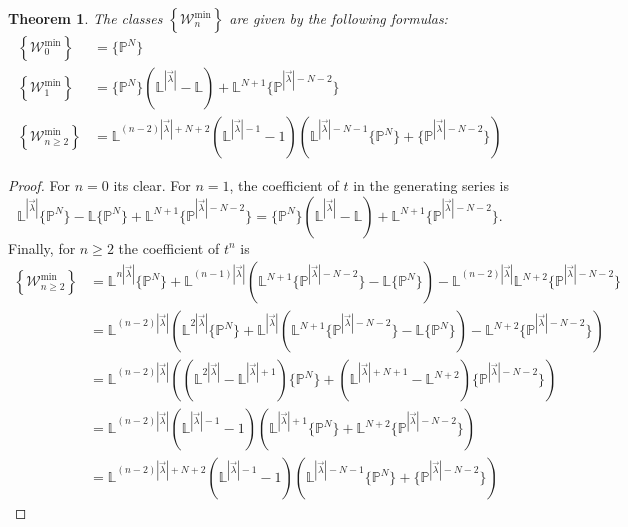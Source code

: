 \documentclass[a4paper,12pt]{amsart}
\newtheorem{thm}{Theorem}[section]
\theoremstyle{definition}
\newcommand{\bP}{\mathbb{P}}
\newcommand{\cW}{\mathcal{W}}
\newcommand{\Pb}{\mathbb{P}}
\newcommand{\Lb}{\mathbb{L}}
\begin{document}
	\begin{thm}\label{thm:tbd9}
		The classes $\left\{ \cW_{n}^{\mathrm{min}} \right\}$ are given by the following formulas:
		\begin{align*}
			\left\{ \cW_{0}^{\mathrm{min}} \right\} &=  \{\bP^N\} \\
			\left\{ \cW_{1}^{\mathrm{min}} \right\} 
			&= \{\Pb^N\} ( \Lb^{|\vec{\lambda}|} - \Lb ) + \Lb^{N+1}\{\Pb^{|\vec{\lambda}|-N-2}\} \\
			\left\{ \cW_{n \ge 2}^{\mathrm{min}} \right\} 
			&= \Lb^{(n-2)|\vec{\lambda}| + N + 2} ( \Lb^{|\vec{\lambda}|-1} - 1 ) ( \Lb^{|\vec{\lambda}|-N-1}\{\Pb^N\} + \{\Pb^{|\vec{\lambda}|-N-2}\} )
		\end{align*}
	\end{thm}
	
	\begin{proof}  For $n = 0$ its clear. For $n = 1$, the coefficient of $t$ in the generating series is
		$$
		\Lb^{|\vec{\lambda}|}\{\Pb^N\} - \Lb\{\Pb^N\} + \Lb^{N+1}\{\Pb^{|\vec{\lambda}|-N-2}\} = \{\Pb^N\} ( \Lb^{|\vec{\lambda}|} - \Lb ) + \Lb^{N+1}\{\Pb^{|\vec{\lambda}|-N-2}\}. 
		$$
		Finally, for $n \geq 2$ the coefficient of $t^n$ is
		\begin{align*}
			\left\{ \cW_{n \ge 2}^{\mathrm{min}} \right\} &= 
			\Lb^{n|\vec{\lambda}|}\{\Pb^N\} + \Lb^{(n-1)|\vec{\lambda}|} (\Lb^{N+1}\{\Pb^{|\vec{\lambda}|-N-2}\} - \Lb \{\Pb^N\}) - \Lb^{(n-2)|\vec{\lambda}|} \Lb^{N+2}\{\Pb^{|\vec{\lambda}|-N-2}\} \\  
			&= \Lb^{(n-2)|\vec{\lambda}|} \left( \Lb^{2|\vec{\lambda}|} \{\Pb^N\} + \Lb^{|\vec{\lambda}|}  (\Lb^{N+1}\{\Pb^{|\vec{\lambda}|-N-2}\} - \Lb \{\Pb^N\}) - \Lb^{N+2} \{\Pb^{|\vec{\lambda}|-N-2}\} \right) \\ 
			&= \Lb^{(n-2)|\vec{\lambda}|} \left( (\Lb^{2|\vec{\lambda}|} - \Lb^{|\vec{\lambda}|+1}) \{\Pb^N\} + (\Lb^{|\vec{\lambda}|+N+1} - \Lb^{N+2})\{\Pb^{|\vec{\lambda}|-N-2}\} \right) \\ 
			&= \Lb^{(n-2)|\vec{\lambda}|} ( \Lb^{|\vec{\lambda}|-1} - 1 ) ( \Lb^{|\vec{\lambda}|+1}\{\Pb^N\} + \Lb^{N+2}\{\Pb^{|\vec{\lambda}|-N-2}\} ) \\
			&= \Lb^{(n-2)|\vec{\lambda}| + N + 2} ( \Lb^{|\vec{\lambda}|-1} - 1 ) ( \Lb^{|\vec{\lambda}|-N-1}\{\Pb^N\} + \{\Pb^{|\vec{\lambda}|-N-2}\} )
	\end{align*} \end{proof}
	
\end{document}
